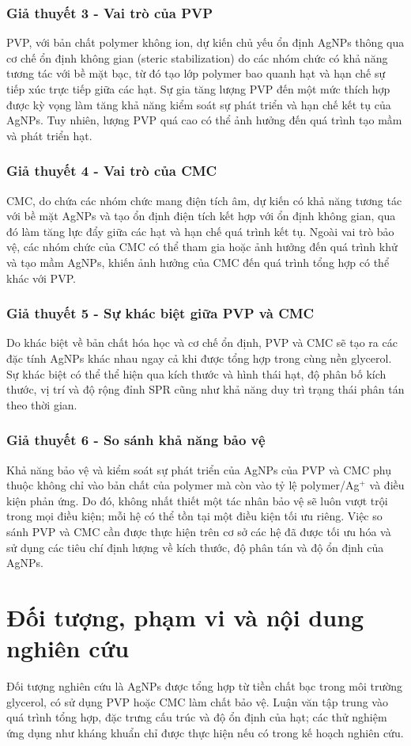 \subsubsection{Giả thuyết 3 - Vai trò của PVP}
PVP, với bản chất polymer không ion, dự kiến chủ yếu ổn định AgNPs thông qua cơ chế ổn định không gian (steric stabilization) do các nhóm chức có khả năng tương tác với bề mặt bạc, từ đó tạo lớp polymer bao quanh hạt và hạn chế sự tiếp xúc trực tiếp giữa các hạt.
Sự gia tăng lượng PVP đến một mức thích hợp được kỳ vọng làm tăng khả năng kiểm soát sự phát triển và hạn chế kết tụ của AgNPs. Tuy nhiên, lượng PVP quá cao có thể ảnh hưởng đến quá trình tạo mầm và phát triển hạt.
\subsubsection{Giả thuyết 4 - Vai trò của CMC}
CMC, do chứa các nhóm chức mang điện tích âm, dự kiến có khả năng tương tác với bề mặt AgNPs và tạo ổn định điện tích kết hợp với ổn định không gian, qua đó làm tăng lực đẩy giữa các hạt và hạn chế quá trình kết tụ.
Ngoài vai trò bảo vệ, các nhóm chức của CMC có thể tham gia hoặc ảnh hưởng đến quá trình khử và tạo mầm AgNPs, khiến ảnh hưởng của CMC đến quá trình tổng hợp có thể khác với PVP.
\subsubsection{Giả thuyết 5 - Sự khác biệt giữa PVP và CMC}
Do khác biệt về bản chất hóa học và cơ chế ổn định, PVP và CMC sẽ tạo ra các đặc tính AgNPs khác nhau ngay cả khi được tổng hợp trong cùng nền glycerol.
Sự khác biệt có thể thể hiện qua kích thước và hình thái hạt, độ phân bố kích thước, vị trí và độ rộng đỉnh SPR cũng như khả năng duy trì trạng thái phân tán theo thời gian.
\subsubsection{Giả thuyết 6 - So sánh khả năng bảo vệ}
Khả năng bảo vệ và kiểm soát sự phát triển của AgNPs của PVP và CMC phụ thuộc không chỉ vào bản chất của polymer mà còn vào tỷ lệ polymer/Ag$^+$ và điều kiện phản ứng.
Do đó, không nhất thiết một tác nhân bảo vệ sẽ luôn vượt trội trong mọi điều kiện; mỗi hệ có thể tồn tại một điều kiện tối ưu riêng.
Việc so sánh PVP và CMC cần được thực hiện trên cơ sở các hệ đã được tối ưu hóa và sử dụng các tiêu chí định lượng về kích thước, độ phân tán và độ ổn định của AgNPs.

\section{Đối tượng, phạm vi và nội dung nghiên cứu}
Đối tượng nghiên cứu là AgNPs được tổng hợp từ tiền chất bạc trong môi trường glycerol, có sử dụng PVP hoặc CMC làm chất bảo vệ. Luận văn tập trung vào quá trình tổng hợp, đặc trưng cấu trúc và độ ổn định của hạt; các thử nghiệm ứng dụng như kháng khuẩn chỉ được thực hiện nếu có trong kế hoạch nghiên cứu.

